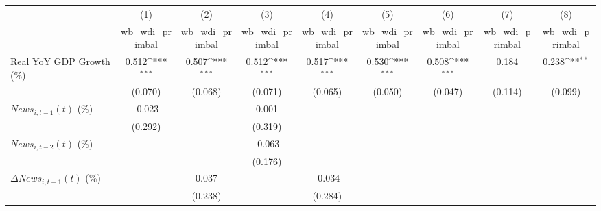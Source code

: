 {
\def\sym#1{\ifmmode^{#1}\else\(^{#1}\)\fi}
\begin{tabular}{l*{8}{c}}
\toprule
                    &\multicolumn{1}{c}{(1)}&\multicolumn{1}{c}{(2)}&\multicolumn{1}{c}{(3)}&\multicolumn{1}{c}{(4)}&\multicolumn{1}{c}{(5)}&\multicolumn{1}{c}{(6)}&\multicolumn{1}{c}{(7)}&\multicolumn{1}{c}{(8)}\\
                    &\multicolumn{1}{c}{wb_wdi_primbal}&\multicolumn{1}{c}{wb_wdi_primbal}&\multicolumn{1}{c}{wb_wdi_primbal}&\multicolumn{1}{c}{wb_wdi_primbal}&\multicolumn{1}{c}{wb_wdi_primbal}&\multicolumn{1}{c}{wb_wdi_primbal}&\multicolumn{1}{c}{wb_wdi_primbal}&\multicolumn{1}{c}{wb_wdi_primbal}\\
\midrule
Real YoY GDP Growth (\%)&       0.512\sym{***}&       0.507\sym{***}&       0.512\sym{***}&       0.517\sym{***}&       0.530\sym{***}&       0.508\sym{***}&       0.184         &       0.238\sym{**} \\
                    &     (0.070)         &     (0.068)         &     (0.071)         &     (0.065)         &     (0.050)         &     (0.047)         &     (0.114)         &     (0.099)         \\
\addlinespace
$ News_{i,t-1}(t)$ (\%)&      -0.023         &                     &       0.001         &                     &                     &                     &                     &                     \\
                    &     (0.292)         &                     &     (0.319)         &                     &                     &                     &                     &                     \\
\addlinespace
$ News_{i,t-2}(t)$ (\%)&                     &                     &      -0.063         &                     &                     &                     &                     &                     \\
                    &                     &                     &     (0.176)         &                     &                     &                     &                     &                     \\
\addlinespace
$ \Delta News_{i,t-1}(t)$ (\%)&                     &       0.037         &                     &      -0.034         &                     &                     &                     &                     \\
                    &                     &     (0.238)         &                     &     (0.284)         &                     &                     &                     &                     \\

\end{tabular}}
